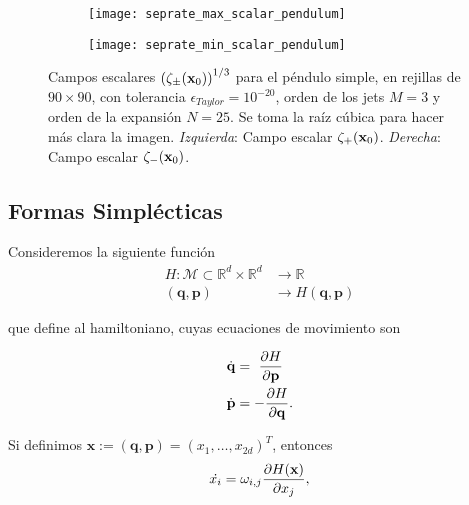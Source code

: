 \begin{figure}[h!]
\centering
\begin{subfigure}{0.49\textwidth}
	\centering
	\texttt{[image: seprate\_max\_scalar\_pendulum]}
\end{subfigure}
%
\begin{subfigure}{0.49\textwidth}
	\centering
	\texttt{[image: seprate\_min\_scalar\_pendulum]}
\end{subfigure}
\caption{ Campos escalares $\left( \zeta_\pm(\mathbf{x}_0) \right)^{1/3}$ para el péndulo simple, en rejillas de $90\times 90$, con tolerancia $\epsilon_{Taylor} = 10^{-20}$, orden de los jets $M=3$ y orden de la expansión $N=25$. Se toma la raíz cúbica para hacer más clara la imagen. \textit{Izquierda}: Campo escalar $\zeta_+(\mathbf{x}_0)$. \textit{Derecha}: Campo escalar $\zeta_-(\mathbf{x}_0)$.}
\label{fig:seprate_scalar_pendulum}
\end{figure}


\subsection{Formas Simplécticas}
\label{sec:formas-simplecticas}

Consideremos la siguiente función
\begin{align*}
H: \mathcal{M} \subset \mathbb{R}^d\times\mathbb{R}^d &\to \mathbb{R} \\ 
	(\mathbf{q},\mathbf{p}) &\to H(\mathbf{q},\mathbf{p})
\end{align*}

que define al hamiltoniano, cuyas ecuaciones de movimiento son

\begin{align*}
 \dot{\mathbf{q}} &= \ \frac{\partial H}{\partial \mathbf{p}} \\
 \dot{\mathbf{p}} &= - \frac{\partial H}{\partial \mathbf{q}}. 
\end{align*}

Si definimos $\mathbf{x} := (\mathbf{q},\mathbf{p}) = (x_1,\ldots,x_{2d})^T$, entonces
\begin{equation}
 \dot{x_i} = \omega_{i,j} \frac{\partial H(\mathbf{x})}{\partial x_j},
 \label{eq:symplectic_ham_ode}
\end{equation}

